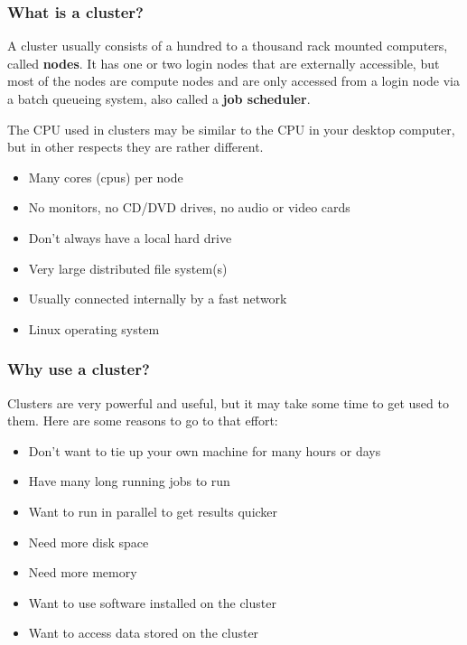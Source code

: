 \documentclass[10pt]{beamer}
\begin{document}
\begin{frame}
\frametitle{What is a cluster?}

A cluster usually consists of a hundred to a thousand rack mounted
computers, called \textbf{nodes}.  It has one or two login nodes
that are externally accessible, but most of the nodes are
compute nodes and are only accessed from a login node via a
batch queueing system, also called a \textbf{job scheduler}.

\vskip10pt
The CPU used in clusters may be similar to the CPU in your
desktop computer, but in other respects they are rather different.

\begin{itemize}
\item Many cores (cpus) per node
\item No monitors, no CD/DVD drives, no audio or video cards
\item Don't always have a local hard drive
\item Very large distributed file system(s)
\item Usually connected internally by a fast network
\item Linux operating system
\end{itemize}
\end{frame}

\begin{frame}
\frametitle{Why use a cluster?}
Clusters are very powerful and useful, but it may take some
time to get used to them.
Here are some reasons to go to that effort:

\begin{itemize}
\item Don't want to tie up your own machine for many hours or days
\item Have many long running jobs to run
\item Want to run in parallel to get results quicker
\item Need more disk space
\item Need more memory
\item Want to use software installed on the cluster
\item Want to access data stored on the cluster
\end{itemize}
\end{frame}
\end{document}
